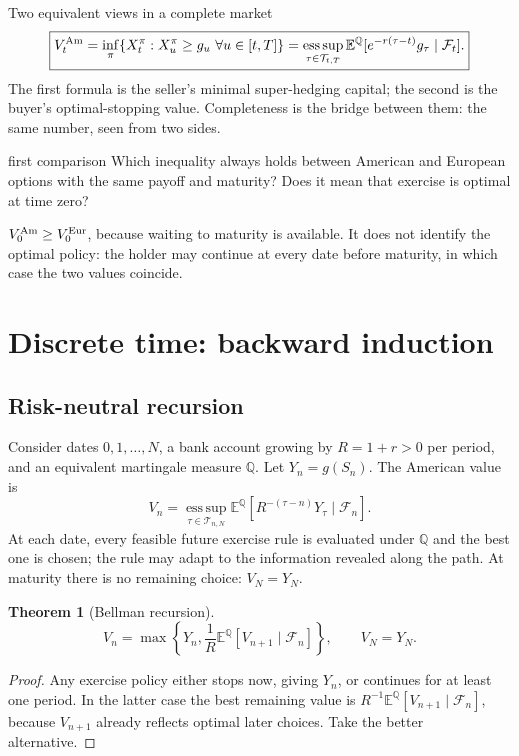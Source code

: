 \documentclass[10pt]{article}
\newcommand{\E}{\mathbb E}
\newcommand{\Q}{\mathbb Q}
\newcommand{\1}{\mathbf 1}
\newcommand{\cF}{\mathcal F}
\newcommand{\esssup}{\operatorname*{ess\,sup}}
\theoremstyle{definition}
\newtheorem{theorem}[definition]{Theorem}
\begin{document}
\begin{keyidea}{Two equivalent views in a complete market}
\[
\boxed{
V_t^{\rm Am}
=\inf_{\pi}\{X^\pi_t:X^\pi_u\geq g_u\ \forall u\in[t,T]\}
=\esssup_{\tau\in\mathcal T_{t,T}}
\E^\Q[e^{-r(\tau-t)}g_\tau\mid\cF_t].}
\]
The first formula is the seller's minimal super-hedging capital; the second
is the buyer's optimal-stopping value. Completeness is the bridge between
them: the same number, seen from two sides.
\end{keyidea}

\begin{studentexercise}{first comparison}
Which inequality always holds between American and European options with the
same payoff and maturity? Does it mean that exercise is optimal at time zero?
\end{studentexercise}
\begin{shortsolution}
\(V_0^{\rm Am}\geq V_0^{\rm Eur}\), because waiting to maturity is
available. It does not identify the optimal policy: the holder may continue
at every date before maturity, in which case the two values coincide.
\end{shortsolution}

\section{Discrete time: backward induction}

\subsection{Risk-neutral recursion}

Consider dates \(0,1,\ldots,N\), a bank account growing by \(R=1+r>0\) per
period, and an equivalent martingale measure \(\Q\). Let \(Y_n=g(S_n)\). The
American value is
\[
V_n=\esssup_{\tau\in\mathcal T_{n,N}}
\E^\Q[R^{-(\tau-n)}Y_\tau\mid\cF_n].
\]
At each date, every feasible future exercise rule is evaluated under \(\Q\)
and the best one is chosen; the rule may adapt to the information revealed
along the path. At maturity there is no remaining choice: \(V_N=Y_N\).

\medskip
\begin{theorem}[Bellman recursion]
\[
\boxed{
V_n=\max\left\{Y_n,\frac1R\E^\Q[V_{n+1}\mid\cF_n]\right\},
\qquad V_N=Y_N.}
\]
\end{theorem}
\begin{proof}
Any exercise policy either stops now, giving \(Y_n\), or continues for at
least one period. In the latter case the best remaining value is
\(R^{-1}\E^\Q[V_{n+1}\mid\cF_n]\), because \(V_{n+1}\) already reflects
optimal later choices. Take the better alternative.
\end{proof}
\end{document}
